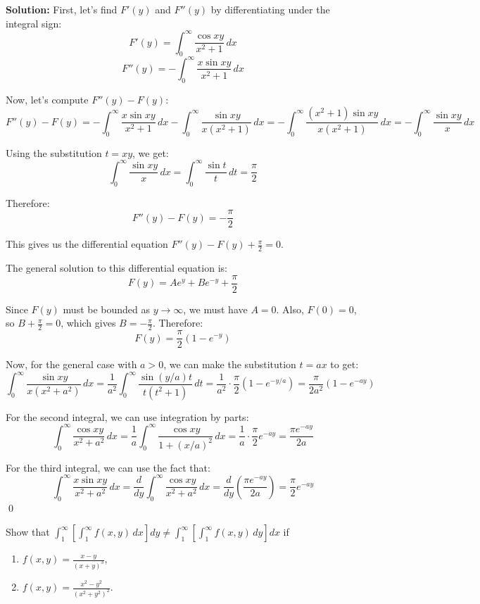 \noindent\textbf{Solution:}
First, let's find $F'(y)$ and $F''(y)$ by differentiating under the integral sign:
\[F'(y) = \int_{0}^{\infty} \frac{\cos xy}{x^2 + 1} \, dx\]
\[F''(y) = -\int_{0}^{\infty} \frac{x \sin xy}{x^2 + 1} \, dx\]

Now, let's compute $F''(y) - F(y)$:
\[F''(y) - F(y) = -\int_{0}^{\infty} \frac{x \sin xy}{x^2 + 1} \, dx - \int_{0}^{\infty} \frac{\sin xy}{x(x^2 + 1)} \, dx = -\int_{0}^{\infty} \frac{(x^2 + 1) \sin xy}{x(x^2 + 1)} \, dx = -\int_{0}^{\infty} \frac{\sin xy}{x} \, dx\]

Using the substitution $t = xy$, we get:
\[\int_{0}^{\infty} \frac{\sin xy}{x} \, dx = \int_{0}^{\infty} \frac{\sin t}{t} \, dt = \frac{\pi}{2}\]

Therefore:
\[F''(y) - F(y) = -\frac{\pi}{2}\]

This gives us the differential equation $F''(y) - F(y) + \frac{\pi}{2} = 0$.

The general solution to this differential equation is:
\[F(y) = A e^y + B e^{-y} + \frac{\pi}{2}\]

Since $F(y)$ must be bounded as $y \to \infty$, we must have $A = 0$. Also, $F(0) = 0$, so $B + \frac{\pi}{2} = 0$, which gives $B = -\frac{\pi}{2}$. Therefore:
\[F(y) = \frac{\pi}{2} (1 - e^{-y})\]

Now, for the general case with $a > 0$, we can make the substitution $t = ax$ to get:
\[\int_{0}^{\infty} \frac{\sin xy}{x(x^2 + a^2)} \, dx = \frac{1}{a^2} \int_{0}^{\infty} \frac{\sin (y/a)t}{t(t^2 + 1)} \, dt = \frac{1}{a^2} \cdot \frac{\pi}{2} (1 - e^{-y/a}) = \frac{\pi}{2a^2} (1 - e^{-ay})\]

For the second integral, we can use integration by parts:
\[\int_{0}^{\infty} \frac{\cos xy}{x^2 + a^2} \, dx = \frac{1}{a} \int_{0}^{\infty} \frac{\cos xy}{1 + (x/a)^2} \, dx = \frac{1}{a} \cdot \frac{\pi}{2} e^{-ay} = \frac{\pi e^{-ay}}{2a}\]

For the third integral, we can use the fact that:
\[\int_{0}^{\infty} \frac{x \sin xy}{x^2 + a^2} \, dx = \frac{d}{dy} \int_{0}^{\infty} \frac{\cos xy}{x^2 + a^2} \, dx = \frac{d}{dy} \left(\frac{\pi e^{-ay}}{2a}\right) = \frac{\pi}{2} e^{-ay}\]\qed


\begin{problembox}
Show that $\int_{1}^{\infty} \left[ \int_{1}^{\infty} f(x, y) \, dx \right] dy \neq \int_{1}^{\infty} \left[ \int_{1}^{\infty} f(x, y) \, dy \right] dx$ if
\begin{enumerate}[label=(\alph*)]
    \item $f(x, y) = \frac{x - y}{(x + y)^3}$,
    \item $f(x, y) = \frac{x^2 - y^2}{(x^2 + y^2)^2}.$
\end{enumerate}
\end{problembox}

